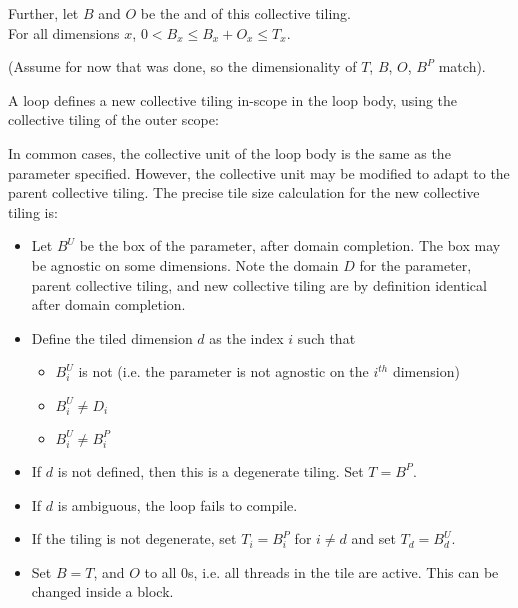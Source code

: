 \filbreak
Further, let $B$ and $O$ be the  and  of this collective tiling.\\
For all dimensions $x$, $0 < B_x \le B_x + O_x \le T_x$.

\filbreak
(Assume for now that  was done, so the dimensionality of $T$, $B$, $O$, $B^P$ match).

\filbreak
{}

A  loop defines a new collective tiling in-scope in the loop body, using the collective tiling of the outer scope:



In common cases, the collective unit of the loop body is the same as the  parameter specified.
However, the collective unit may be modified to adapt to the parent collective tiling.
The precise tile size calculation for the new collective tiling is:
\begin{itemize}
  \item Let $B^U$ be the box of the  parameter, after domain completion.
    The box may be agnostic on some dimensions.
    Note the domain $D$ for the  parameter, parent collective tiling, and new collective tiling are by definition identical after domain completion.
  \filbreak
  \item Define the tiled dimension $d$ as the index $i$ such that
  \begin{itemize}
    \item $B^U_i$ is not  (i.e. the  parameter is not agnostic on the $i^{th}$ dimension)
    \item $B^U_i \ne D_i$
    \item $B^U_i \ne B^P_i$
  \end{itemize}
  \filbreak
  \item If $d$ is not defined, then this is a degenerate tiling. Set $T = B^P$.
  \filbreak
  \item If $d$ is ambiguous, the  loop fails to compile.
  \filbreak
  \item If the tiling is not degenerate, set $T_i = B^P_i$ for $i \ne d$ and set $T_d = B^U_d$.
  \filbreak
  \item Set $B = T$, and $O$ to all 0s, i.e. all threads in the tile are active. This can be changed inside a  block.
\end{itemize}

